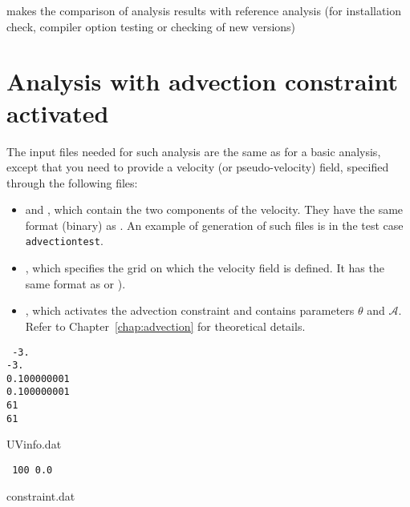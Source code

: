  makes the comparison of analysis results with reference analysis (for
installation check, compiler option testing or checking of new versions)



\section{Analysis with advection constraint activated}

The input files needed for such analysis are the same as for a basic analysis, except that you need to provide a velocity (or pseudo-velocity) field, specified through the following files:
\begin{itemize}
\item {} and , which contain the two components of the velocity. They have the same format (binary) as . An example of generation of such files is in the test case {\tt advectiontest}.
\item {}, which specifies the grid on which the velocity field is defined. It has the same format as  or ).
\item {}, which activates the advection constraint and contains parameters $\theta$ and $\mathcal{A}$. Refer to Chapter~\ref{chap:advection} for theoretical details.
\end{itemize}

\begin{exfile}[htpb]
\begin{footnotesize}
\texttt{
-3.\\
-3.\\
0.100000001\\
0.100000001\\
61\\
61
} 
\end{footnotesize}
\caption{UVinfo.dat\label{ex:UVinfo.dat}}
\end{exfile}


\begin{exfile}[htpb]
\begin{footnotesize}
\texttt{
100 0.0
} 
\end{footnotesize}
\caption{constraint.dat\label{ex:constraint.dat}}
\end{exfile}

